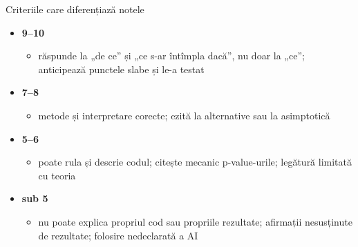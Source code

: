 \begin{frame}{Criteriile care diferențiază notele}
\itemsize{\small}
\begin{itemize}
    \item \textbf{9--10}
    \begin{itemize}
        \item răspunde la „de ce” și „ce s-ar întîmpla dacă”, nu doar la „ce”; anticipează punctele slabe și le-a testat
    \end{itemize}
    \item \textbf{7--8}
    \begin{itemize}
        \item metode și interpretare corecte; ezită la alternative sau la asimptotică
    \end{itemize}
    \item \textbf{5--6}
    \begin{itemize}
        \item poate rula și descrie codul; citește mecanic p-value-urile; legătură limitată cu teoria
    \end{itemize}
    \item \textbf{sub 5}
    \begin{itemize}
        \item nu poate explica propriul cod sau propriile rezultate; afirmații nesusținute de rezultate; folosire nedeclarată a AI
    \end{itemize}
\end{itemize}
\end{frame}

